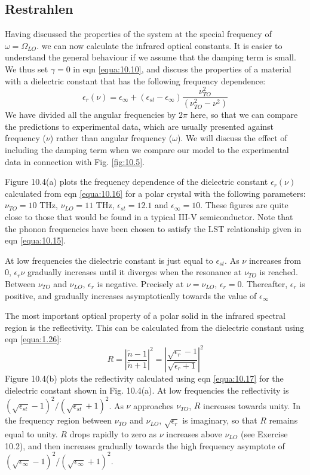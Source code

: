 \documentclass[12pt]{book}
\begin{document}
\subsection{Restrahlen}

Having discussed the properties of the system at the special frequency of $\omega=\Omega_{LO}$. we can now calculate the infrared optical constants. It is easier to understand the general behaviour if we assume that the damping term is small. We thus set $\gamma=0$ in eqn \ref{equa:10.10}, and discuss the properties of a material with a dielectric constant that has the following frequency dependence:
\begin{equation}\label{equa:10.16}
  \epsilon_r(\nu)=\epsilon_{\infty}+(\epsilon_{st}-\epsilon_{\infty})\frac{\nu_{TO}^2}{(\nu_{TO}^2-\nu^2)}
\end{equation}
We have divided all the angular frequencies by $2\pi$ here, so that we can compare the predictions to experimental data, which are usually presented against frequency ($\nu$) rather than angular frequency ($\omega$). We will discuss the effect of including the damping term when we compare our model to the experimental data in connection with Fig. \ref{fig:10.5}.

Figure 10.4(a) plots the frequency dependence of the dielectric constant $\epsilon_r(\nu)$ calculated from eqn \ref{equa:10.16} for a polar crystal with the following parameters: $\nu_{TO} = 10$ THz, $\nu_{LO} = 11$ THz, $\epsilon_{st}=12.1$ and $\epsilon_\infty=10$. These figures are quite close to those that would be found in a typical III-V semiconductor. Note that the phonon frequencies have been chosen to satisfy the LST relationship given in eqn \ref{equa:10.15}.

At low frequencies the dielectric constant is just equal to $\epsilon_{st}$. As $\nu$ increases from 0, $\epsilon_r{\nu}$ gradually increases until it diverges when the resonance at $\nu_{TO}$ is reached. Between $\nu_{TO}$ and $\nu_{LO}$, $\epsilon_r$ is negative. Precisely at $\nu = \nu_{LO}$, $\epsilon_r=0$. Thereafter, $\epsilon_r$ is positive, and gradually increases asymptotically towards the value of $\epsilon_{\infty}$

The most important optical property of a polar solid in the infrared spectral region is the reflectivity. This can be calculated from the dielectric constant using eqn \ref{equa:1.26}:
\begin{equation}\label{equa:10.17}
  R=|\frac{\tilde{n}-1}{\tilde{n}+1}|^2=|\frac{\sqrt{\epsilon_r}-1}{\sqrt{\epsilon_r+1}}|^2
\end{equation}
Figure 10.4(b) plots the reflectivity calculated using eqn \ref{equa:10.17} for the dielectric constant shown in Fig. 10.4(a). At low frequencies the reflectivity is $(\sqrt{\epsilon_{st}}-1)^2/(\sqrt{\epsilon_{st}}+1)^2$. As $\nu$ approaches $\nu_{TO}$, $R$ increases towards unity. In the frequency region between $\nu_{TO}$ and $\nu_{LO}$, $\sqrt{\epsilon_r}$ is imaginary, so that $R$ remains equal to unity. $R$ drops rapidly to zero as $\nu$ increases above $\nu_{LO}$ (see Exercise 10.2), and then increases gradually towards the high frequency asymptote of $(\sqrt{\epsilon_{\infty}}-1)^2/(\sqrt{\epsilon_{\infty}}+1)^2$.
\end{document}
